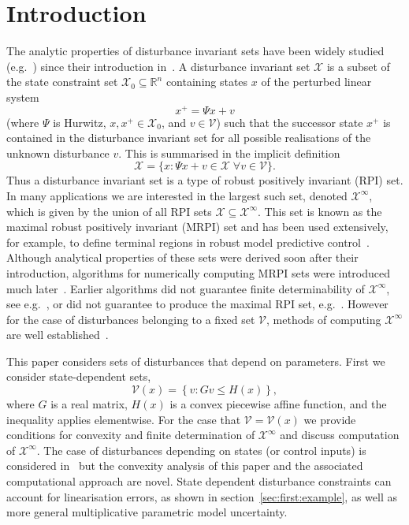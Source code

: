 \documentclass[letterpaper, 10pt, conference]{ieeeconf} %
\begin{document}
\section{Introduction}
The analytic properties of disturbance invariant sets have been widely
studied (e.g.~\cite{blanchini:2007}) 
since their introduction in~\cite{Glover:1971,bertsekas71}. A disturbance invariant set $\mathscr X$ is a subset of the 
state constraint set $\mathcal X_0\subseteq\mathbb R^n$ containing states $x$ of the perturbed linear system
\begin{equation}\label{eq:system:equation}
	x^+ = \Psi x + v
\end{equation}
(where $\Psi$ is Hurwitz, $x,x^+\in\mathcal X_0$, and 
$v\in\mathscr V$) such that the successor state $x^+$ is contained in the 
disturbance invariant set for all possible realisations of the 
unknown disturbance $v$. This is summarised in the implicit definition
\begin{equation}\label{eq:definition:MRPI:set:state:dependent}
	\mathscr X = \{x:\Psi x + v\in\mathscr X\; \forall v\in\mathscr V\}.
\end{equation}
Thus a disturbance invariant set is a type of robust positively invariant (RPI) set. 
In many applications we are interested in the largest such set, denoted $\mathcal X^\infty$, which is given 
by the union of all RPI sets $\mathscr X\subseteq\mathcal X^\infty$. This set is known as the maximal robust 
positively invariant (MRPI) set and has been used extensively, for example, to define terminal regions in 
robust model predictive control~\cite{mayne:2000}. Although analytical properties
of these sets were derived soon after their introduction, algorithms for numerically computing MRPI sets 
were introduced much later~\cite{Blanchini:1994,DeSantis:1994,Kolmanovsky:1998}. 
Earlier algorithms did not guarantee finite determinability of $\mathcal X^\infty$, see e.g.~\cite{Blanchini:1990}, 
or did not guarantee to produce the maximal RPI set, e.g.~\cite{Blanchini:1991}. 
%
However for the case of disturbances belonging to a fixed set $\mathscr V$, methods of computing 
$\mathcal X^\infty$ are well established~\cite{blanchini:2007}.

This paper considers sets of disturbances that depend on
parameters. First we consider state-dependent sets,
\begin{equation}\label{eq:PWA:distrubance:set}
	\mathcal V(x) = \left\{v: Gv\leq H(x)\right\},
\end{equation}
where $G$ is a real matrix,
$H(x)$ is a convex piecewise affine function, and the inequality applies elementwise. For the case that $\mathscr V=\mathcal V(x)$ we
provide conditions for convexity and finite determination of $\mathcal X^\infty$ and discuss 
computation of $\mathcal X^\infty$. The case of disturbances depending on states (or control inputs) 
is considered in~\cite{Kuntsevich:1995,rakovic06} but the convexity
analysis of this paper and the associated computational approach are novel. 
State dependent disturbance constraints can account for linearisation errors, as shown in section~\ref{sec:first:example}, 
as well as more general multiplicative parametric model uncertainty.
\end{document}
